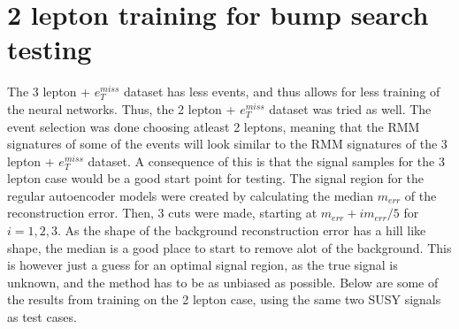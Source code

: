 
\section{2 lepton training for bump search testing}

The 3 lepton + $e_T^{miss}$ dataset has less events, and thus allows for less training of the neural networks. 
Thus, the 2 lepton + $e_T^{miss}$ dataset was tried as well. The event selection was done choosing atleast 
2 leptons, meaning that the RMM signatures of some of the events will look similar to the RMM signatures of 
the 3 lepton + $e_T^{miss}$ dataset. A consequence of this is that the signal samples for the 3 lepton case 
would be a good start point for testing. The signal region for the regular autoencoder models were created by 
calculating the median $m_{err}$ of the reconstruction error. Then, 3 cuts were made, starting at 
$m_{err} + im_{err}/5$ for $i = 1,2,3$. As the shape of the background reconstruction error has a hill like 
shape, the median is a good place to start to remove alot of the background. This is however just a guess 
for an optimal signal region, as the true signal is unknown, and the method has to be as unbiased as possible. 
Below are some of the results from training on the 2 lepton case, using the same two SUSY signals as test cases. 


